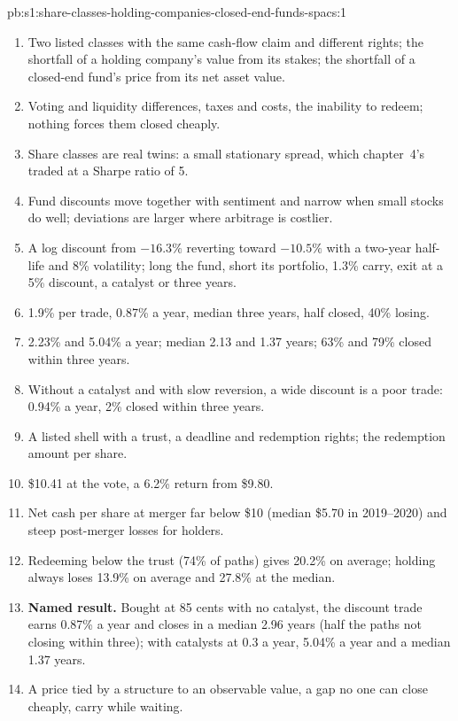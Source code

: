 \begin{solution}{pb:s1:share-classes-holding-companies-closed-end-funds-spacs:1}
\begin{enumerate}
\item Two listed classes with the same cash-flow claim and different rights; the shortfall of a holding company's value from its stakes; the shortfall of a
closed-end fund's price from its net asset value.
\item Voting and liquidity differences, taxes and costs, the inability to redeem; nothing forces them closed cheaply.
\item Share classes are real twins: a small stationary spread, which chapter~4's  traded at a Sharpe ratio of 5.
\item Fund discounts move together with sentiment and narrow when small stocks do well; deviations are larger where arbitrage is costlier.
\item A log discount from $-16.3\%$ reverting toward $-10.5\%$ with a two-year half-life and 8\% volatility; long the fund, short its portfolio, 1.3\% carry,
exit at a 5\% discount, a catalyst or three years.
\item 1.9\% per trade, 0.87\% a year, median three years, half closed, 40\% losing.
\item 2.23\% and 5.04\% a year; median 2.13 and 1.37 years; 63\% and 79\% closed within three years.
\item Without a catalyst and with slow reversion, a wide discount is a poor trade: 0.94\% a year, 2\% closed within three years.
\item A listed shell with a trust, a deadline and redemption rights; the redemption amount per share.
\item \$10.41 at the vote, a 6.2\% return from \$9.80.
\item Net cash per share at merger far below \$10 (median \$5.70 in 2019--2020) and steep post-merger losses for holders.
\item Redeeming below the trust (74\% of paths) gives 20.2\% on average; holding always loses 13.9\% on average and 27.8\% at the median.
\item \textbf{Named result.} Bought at 85 cents with no catalyst, the discount trade earns 0.87\% a year and closes in a median 2.96 years (half the paths not
closing within three); with catalysts at 0.3 a year, 5.04\% a year and a median 1.37 years.
\item A price tied by a structure to an observable value, a gap no one can close cheaply, carry while waiting.

\end{enumerate}
\end{solution}
